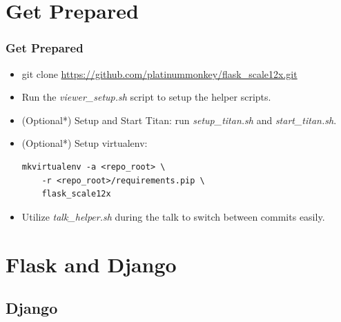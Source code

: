 \documentclass{beamer}
\begin{document}
\section{Get Prepared}
\begin{frame}[fragile]
\frametitle{Get Prepared}
\begin{itemize}
\item \footnotesize git clone \url{https://github.com/platinummonkey/flask\_scale12x.git}\normalsize
\item Run the \emph{viewer\_setup.sh} script to setup the helper scripts.
\item (Optional*) Setup and Start Titan: run \emph{setup\_titan.sh} and \emph{start\_titan.sh}.
\item (Optional*) Setup virtualenv:
\begin{verbatim}
mkvirtualenv -a <repo_root> \
    -r <repo_root>/requirements.pip \
    flask_scale12x
\end{verbatim}
\item Utilize \emph{talk\_helper.sh} during the talk to switch between commits easily.
\end{itemize}
\end{frame}

\section{Flask and Django}
\subsection{Django}
\end{document}
